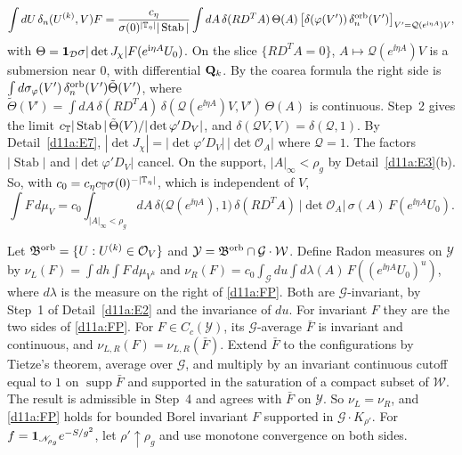 \begin{detail}
\begin{step}
\[
\int dU\,\delta_n(U^{(k)},V)F=\frac{c_\eta}{\sigma(0)^{|\mathbb T_\eta|}|\operatorname{Stab}|}\int dA\,\delta(RD^TA)\,\Theta(A)\,\big[\delta(\varphi(V'))\,\delta^{\rm orb}_n(V')\big]_{V'=\mathcal Q(e^{\mathrm i\eta A})V},
\]
with $\Theta=\mathbf 1_{\mathcal D}\sigma|\det J_\chi|F(e^{\mathrm i\eta A}U_0)$. On the slice $\{RD^TA=0\}$, $A\mapsto\mathcal Q(e^{\ii\eta A})V$ is a submersion near $0$, with differential $\mathbf Q_k$. By the coarea formula the right side is $\int d\sigma_\varphi(V')\,\delta^{\rm orb}_n(V')\tilde\Theta(V')$, where $\tilde\Theta(V')=\int dA\,\delta(RD^TA)\,\delta(\mathcal Q(e^{\ii\eta A})V,V')\,\Theta(A)$ is continuous. Step~2 gives the limit $c_\mathbb T|\operatorname{Stab}|\,\tilde\Theta(V)/|\det\varphi'D_V|$, and $\delta(\mathcal Q V,V)=\delta(\mathcal Q,1)$. By Detail~\ref{d11a:E7}, $|\det J_\chi|=|\det\varphi'D_V|\,|\det\mathcal O_A|$ where $\mathcal Q=1$. The factors $|\operatorname{Stab}|$ and $|\det\varphi'D_V|$ cancel. On the support, $|A|_\infty<\rho_g$ by Detail~\ref{d11a:E3}(b). So, with $c_0=c_\eta c_\mathbb T\sigma(0)^{-|\mathbb T_\eta|}$, which is independent of $V$,
\begin{equation}\label{d11a:FP}
\int F\,d\mu_V=c_0\int_{|A|_\infty<\rho_g}dA\,\delta\big(\mathcal Q(e^{\ii\eta A}),1\big)\,\delta(RD^TA)\,|\det\mathcal O_A|\,\sigma(A)\,F(e^{\ii\eta A}U_0).
\end{equation}
\end{step}
\begin{step}
Let $\mathfrak B^{\rm orb}=\{U:U^{(k)}\in\mathcal O_V\}$ and $\mathcal Y=\mathfrak B^{\rm orb}\cap\mathcal G\cdot\mathcal W$. Define Radon measures on $\mathcal Y$ by $\nu_L(F)=\int dh\int F\,d\mu_{V^h}$ and $\nu_R(F)=c_0\int_{\mathcal G}du\int d\lambda(A)\,F((e^{\ii\eta A}U_0)^u)$, where $d\lambda$ is the measure on the right of \eqref{d11a:FP}. Both are $\mathcal G$-invariant, by Step~1 of Detail~\ref{d11a:E2} and the invariance of $du$. For invariant $F$ they are the two sides of \eqref{d11a:FP}. For $F\in C_c(\mathcal Y)$, its $\mathcal G$-average $\bar F$ is invariant and continuous, and $\nu_{L,R}(F)=\nu_{L,R}(\bar F)$. Extend $\bar F$ to the configurations by Tietze's theorem, average over $\mathcal G$, and multiply by an invariant continuous cutoff equal to $1$ on $\operatorname{supp}\bar F$ and supported in the saturation of a compact subset of $\mathcal W$. The result is admissible in Step~4 and agrees with $\bar F$ on $\mathcal Y$. So $\nu_L=\nu_R$, and \eqref{d11a:FP} holds for bounded Borel invariant $F$ supported in $\mathcal G\cdot K_{\rho'}$. For $f=\mathbf 1_{\mathscr N_{\rho_g}}e^{-S/g^2}$, let $\rho'\uparrow\rho_g$ and use monotone convergence on both sides.
\end{step}
\end{detail}

